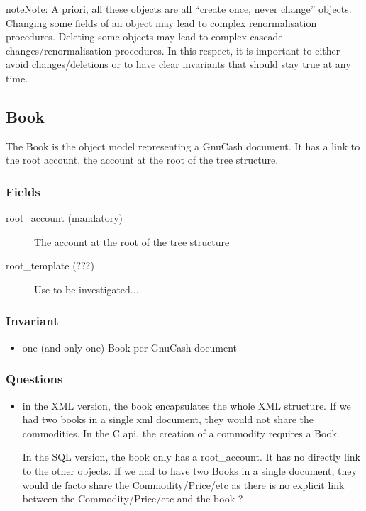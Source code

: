 \documentclass[letterpaper,10pt,english]{sphinxmanual}
\begin{document}
\begin{notice}{note}{Note:}
A priori, all these objects are all ``create once, never change'' objects. Changing some fields of an object may lead to
complex renormalisation procedures. Deleting some objects may lead to complex cascade changes/renormalisation procedures.
In this respect, it is important to either avoid changes/deletions or to have clear invariants that should stay true at any time.
\end{notice}


\subsection{Book}
\label{object_model:book}
The Book is the object model representing a GnuCash document. It has a link to the root account, the account at the
root of the tree structure.


\subsubsection{Fields}
\label{object_model:fields}\begin{description}
\item[{root\_account (mandatory)}] \leavevmode
The account at the root of the tree structure

\item[{root\_template (???)}] \leavevmode
Use to be investigated...

\end{description}


\subsubsection{Invariant}
\label{object_model:invariant}\begin{itemize}
\item {} 
one (and only one) Book per GnuCash document

\end{itemize}


\subsubsection{Questions}
\label{object_model:questions}\begin{itemize}
\item {} 
in the XML version, the book encapsulates the whole XML structure. If we had two books in a single xml document,
they would not share the commodities. In the C api, the creation of a commodity requires a Book.

In the SQL version, the book only has a root\_account. It has no directly link to the other objects. If we had to have
two Books in a single document, they would de facto share the Commodity/Price/etc as there is no explicit link between
the Commodity/Price/etc and the book ?

\end{itemize}
\end{document}

